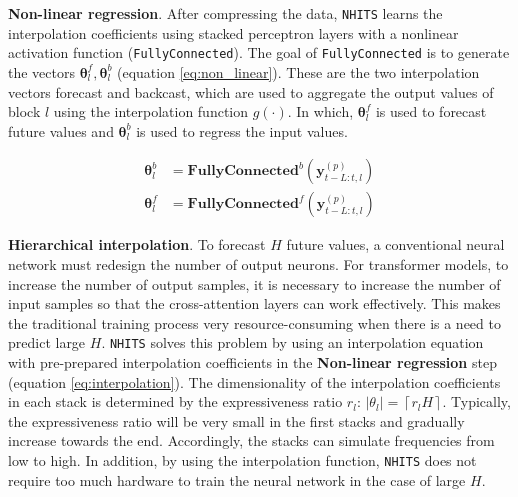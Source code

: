 \textbf{Non-linear regression}. After compressing the data, \verb|NHITS| learns the interpolation coefficients using stacked perceptron layers with a nonlinear activation function (\verb|FullyConnected|). The goal of \verb|FullyConnected| is to generate the vectors $\mathbf{\theta}_l^f, \mathbf{\theta}_l^b$ (equation \ref{eq:non_linear}). These are the two interpolation vectors forecast and backcast, which are used to aggregate the output values of block $l$ using the interpolation function $g(\cdot)$. In which, $\mathbf{\theta}_l^f$ is used to forecast future values and $\mathbf{\theta}_l^b$ is used to regress the input values.

\begin{align}
    \mathbf{\theta}_l^b &= \mathbf{FullyConnected}^b \left( \mathbf{y}_{t-L:t, l}^{(p)} \right)\\
    \mathbf{\theta}_l^f &= \mathbf{FullyConnected}^f \left( \mathbf{y}_{t-L:t, l}^{(p)} \right)
    \label{eq:non_linear}
\end{align}


\textbf{Hierarchical interpolation}. To forecast $H$ future values, a conventional neural network must redesign the number of output neurons. For transformer models, to increase the number of output samples, it is necessary to increase the number of input samples so that the cross-attention layers can work effectively. This makes the traditional training process very resource-consuming when there is a need to predict large $H$. \verb|NHITS| solves this problem by using an interpolation equation with pre-prepared interpolation coefficients in the \textbf{Non-linear regression} step (equation \ref{eq:interpolation}). The dimensionality of the interpolation coefficients in each stack is determined by the expressiveness ratio $r_l$: $\left| \theta_l \right| = \left \lceil r_l H \right \rceil$. Typically, the expressiveness ratio will be very small in the first stacks and gradually increase towards the end. Accordingly, the stacks can simulate frequencies from low to high. In addition, by using the interpolation function, \verb|NHITS| does not require too much hardware to train the neural network in the case of large $H$.


